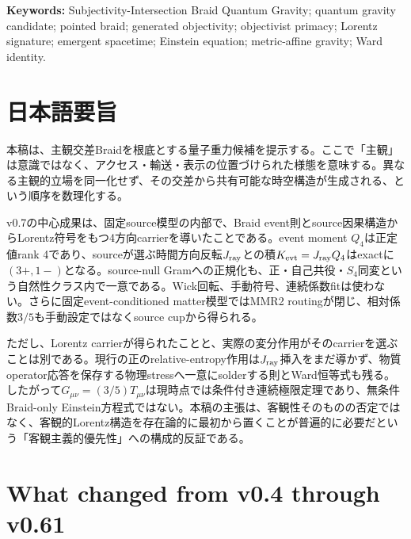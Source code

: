 \documentclass[11pt]{article}
\theoremstyle{definition}
\theoremstyle{remark}
\begin{document}
\begin{abstract}
This strengthens a constructive refutation of \emph{objectivist primacy}. A stable Lorentzian public carrier can be generated from maintained standpoint difference and intersection; it need not be posited as primitive in every admissible construction. The result does not refute mind-independent reality, establish phenomenal consciousness, or show that nature realizes the model. It provides a sharper quantum-gravity candidate and a smaller, explicitly falsifiable completion problem.
\end{abstract}

\noindent\textbf{Keywords:} Subjectivity-Intersection Braid Quantum Gravity; quantum gravity candidate; pointed braid; generated objectivity; objectivist primacy; Lorentz signature; emergent spacetime; Einstein equation; metric-affine gravity; Ward identity.

{\japanesefont
\section*{\japanesefont 日本語要旨}

本稿は、主観交差Braidを根底とする量子重力候補を提示する。ここで「主観」は意識ではなく、アクセス・輸送・表示の位置づけられた様態を意味する。異なる主観的立場を同一化せず、その交差から共有可能な時空構造が生成される、という順序を数理化する。

v0.7の中心成果は、固定source模型の内部で、Braid event則とsource因果構造からLorentz符号をもつ4方向carrierを導いたことである。event moment $Q_4$は正定値rank 4であり、sourceが選ぶ時間方向反転$J_{\rm ray}$との積$K_{\rm evt}=J_{\rm ray}Q_4$はexactに$(3+,1-)$となる。source-null Gramへの正規化も、正・自己共役・$S_4$同変という自然性クラス内で一意である。Wick回転、手動符号、連続係数fitは使わない。さらに固定event-conditioned matter模型ではMMR2 routingが閉じ、相対係数$3/5$も手動設定ではなくsource cupから得られる。

ただし、Lorentz carrierが得られたことと、実際の変分作用がそのcarrierを選ぶことは別である。現行の正のrelative-entropy作用は$J_{\rm ray}$挿入をまだ導かず、物質operator応答を保存する物理stressへ一意にsolderする則とWard恒等式も残る。したがって$G_{\mu\nu}=(3/5)T_{\mu\nu}$は現時点では条件付き連続極限定理であり、無条件Braid-only Einstein方程式ではない。本稿の主張は、客観性そのものの否定ではなく、客観的Lorentz構造を存在論的に最初から置くことが普遍的に必要だという「客観主義的優先性」への構成的反証である。
}

\section{What changed from v0.4 through v0.61}
\end{document}
